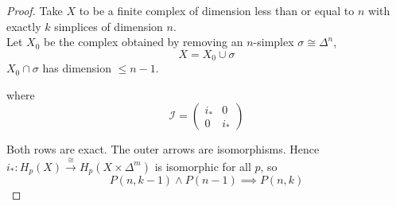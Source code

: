 \documentclass[a4paper,14pt]{extarticle}
\theoremstyle{definition}
\begin{document}
\begin{proof}
	Take $X$ to be a finite complex of dimension less than or equal to $n$ with exactly 
	$k$ simplices of dimension $n$. \\

	Let $X_0$ be the complex obtained by removing an $n$-simplex $\sigma\cong\Delta^n$, 
	\[X=X_0\cup\sigma\] $X_0\cap\sigma$ has dimension $\leq n-1$.

	\vspace{12pt}
	

\vspace{12pt}

	where \[\mathcal{I}=\begin{pmatrix}
		i_* & 0 \\ 0 & i_*
	\end{pmatrix}\]
	
\vspace{12pt}

	Both rows are exact. The outer arrows are isomorphisms. Hence
	$i_*:H_p(X)\xrightarrow{\cong} H_p(X\times\Delta^m)$ is isomorphic for all $p$, so 
	\[P(n,k-1)\wedge P(n-1)\implies P(n,k)\]
\end{proof}
\end{document}
